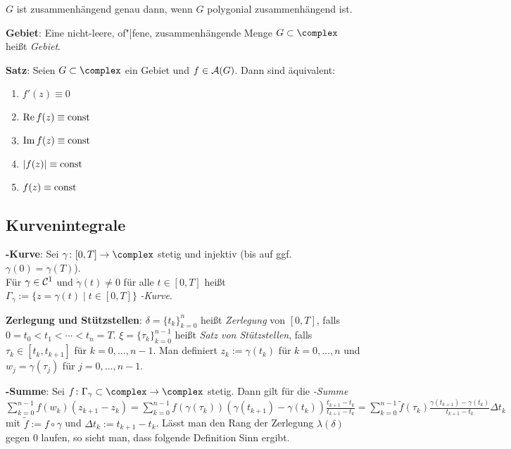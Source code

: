 $G$ ist zusammenhängend genau dann, wenn $G$ polygonial zusammenhängend ist.

\linie

\textbf{Gebiet}:
Eine nicht-leere, of"|fene, zusammenhängende Menge $G \subset \complex$ heißt
\emph{Gebiet}.

\linie

\textbf{Satz}:
Seien $G \subset \complex$ ein Gebiet und $f \in \mathcal{A}(G)$.
Dann sind äquivalent:
\begin{enumerate}
    \item
    $f'(z) \equiv 0$
    
    \item
    $\operatorname{Re} f(z) \equiv \operatorname{const}$
    
    \item
    $\operatorname{Im} f(z) \equiv \operatorname{const}$
    
    \item
    $|f(z)| \equiv \operatorname{const}$
    
    \item
    
    $f(z) \equiv \operatorname{const}$
\end{enumerate}

\subsection{%
    Kurvenintegrale%
}

\textbf{-Kurve}:
Sei $\gamma\colon [0, T] \rightarrow \complex$ stetig und injektiv
(bis auf ggf. $\gamma(0) = \gamma(T)$).\\
Für $\gamma \in \mathcal{C}^1$ und $\dot{\gamma}(t) \not= 0$ für alle $t \in [0, T]$
heißt $\Gamma_\gamma := \{z = \gamma(t) \;|\; t \in [0, T]\}$
\emph{-Kurve}.

\textbf{Zerlegung und Stützstellen}:
$\delta = \{t_k\}_{k=0}^n$ heißt \emph{Zerlegung} von $[0, T]$, falls\\
$0 = t_0 < t_1 < \dotsb < t_n = T$.
$\xi = \{\tau_k\}_{k=0}^{n-1}$ heißt \emph{Satz von Stützstellen}, falls
$\tau_k \in [t_k, t_{k+1}]$ für $k = 0, \dotsc, n - 1$.
Man definiert $z_k := \gamma(t_k)$ für $k = 0, \dotsc, n$ und
$w_j = \gamma(\tau_j)$ für $j = 0, \dotsc, n - 1$.

\textbf{-Summe}:
Sei $f\colon \Gamma_\gamma \subset \complex \rightarrow \complex$ stetig.
Dann gilt für die \emph{-Summe}\\
$\sum_{k=0}^{n-1} f(w_k) (z_{k+1} - z_k)
= \sum_{k=0}^{n-1} f(\gamma(\tau_k)) (\gamma(t_{k+1}) - \gamma(t_k))
\frac{t_{k+1} - t_k}{t_{k+1} - t_k}
= \sum_{k=0}^{n-1} \widetilde{f}(\tau_k)
\frac{\gamma(t_{k+1}) - \gamma(t_k)}{t_{k+1} - t_k} \Delta t_k$\\
mit $\widetilde{f} := f \circ \gamma$ und $\Delta t_k := t_{k+1} - t_k$.
Lässt man den Rang der Zerlegung $\lambda(\delta)$ gegen $0$ laufen, so sieht
man, dass folgende Definition Sinn ergibt.

